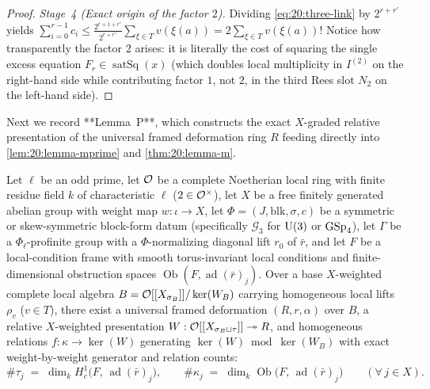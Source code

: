 \begin{proof}
\emph{Stage~4 (Exact origin of the factor $2$).}
Dividing \eqref{eq:20:three-link} by $2^{r + r'}$ yields $\sum_{i=0}^{r-1} c_i \le \frac{2^{r+1+r'}}{2^{r+r'}}\sum_{\xi \in T} v(\xi(a)) = 2 \sum_{\xi \in T} v(\xi(a))$! Notice how transparently the factor $2$ arises: it is literally the cost of squaring the single excess equation $F_r \in \operatorname{satSq}(x)$ (which doubles local multiplicity in $I^{(2)}$ on the right-hand side while contributing factor $1$, not $2$, in the third Rees slot $N_2$ on the left-hand side).
\end{proof}

Next we record **Lemma~P**, which constructs the exact $X$-graded relative presentation of the universal framed deformation ring $R$ feeding directly into \cref{lem:20:lemma-mprime} and \cref{thm:20:lemma-m}.

\begin{proposition}
\label{prop:20:lemma-p}
Let $\ell$ be an odd prime, let $\mathcal{O}$ be a complete Noetherian local ring with finite residue field $k$ of characteristic $\ell$ ($2 \in \mathcal{O}^\times$), let $X$ be a free finitely generated abelian group with weight map $w : \iota \to X$, let $\Phi = (J, \mathrm{blk}, \sigma, c)$ be a symmetric or skew-symmetric block-form datum (specifically $\mathcal{G}_3$ for $\mathrm{U}(3)$ or $\mathrm{GSp}_4$), let $\Gamma$ be a $\Phi_\ell$-profinite group with a $\Phi$-normalizing diagonal lift $r_0$ of $\bar{r}$, and let $F$ be a local-condition frame with smooth torus-invariant local conditions and finite-dimensional obstruction spaces $\operatorname{Ob}(F, \operatorname{ad}(\bar{r})_j)$. Over a base $X$-weighted complete local algebra $B = \mathcal{O}[[X_{\sigma_B}]] / \ker(W_B)$ carrying homogeneous local lifts $\rho_v$ ($v \in T$), there exist a universal framed deformation $(R, r, \alpha)$ over $B$, a relative $X$-weighted presentation $W : \mathcal{O}[[X_{\sigma_B \sqcup \tau}]] \twoheadrightarrow R$, and homogeneous relations $f : \kappa \to \ker(W)$ generating $\ker(W) \bmod \ker(W_B)$ with exact weight-by-weight generator and relation counts:
\begin{equation}
\label{eq:20:lemma-p-counts}
  \#\tau_j \;=\; \dim_k H^1_c\bigl(F,\, \operatorname{ad}(\bar{r})_j\bigr),
  \qquad
  \#\kappa_j \;=\; \dim_k \operatorname{Ob}\bigl(F,\, \operatorname{ad}(\bar{r})_j\bigr)
  \qquad (\forall\, j \in X).
\end{equation}
\end{proposition}

